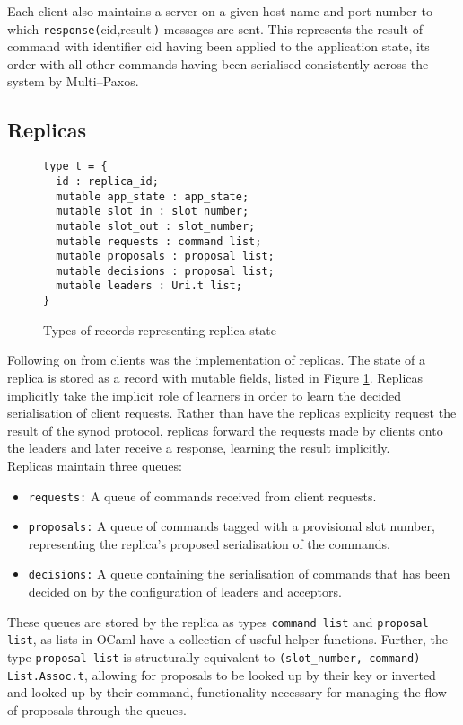 Each client also maintains a server on a given host name and port number to which \texttt{response($\textrm{cid}, \textrm{result}$)} messages are sent. This represents the result of command with identifier $\textrm{cid}$ having been applied to the application state, its order with all other commands having been serialised consistently across the system by Multi--Paxos.

\subsection{Replicas}
\label{section:replicas}

\begin{figure}
\begin{lstlisting}
type t = {
  id : replica_id;
  mutable app_state : app_state;
  mutable slot_in : slot_number;
  mutable slot_out : slot_number;
  mutable requests : command list;
  mutable proposals : proposal list;
  mutable decisions : proposal list;
  mutable leaders : Uri.t list;
}
\end{lstlisting}
\centering
\caption{Types of records representing replica state}
\label{fig:replica-types}
\end{figure}

Following on from clients was the implementation of replicas. The state of a replica is stored as a record with mutable fields, listed in Figure \ref{fig:replica-types}. Replicas implicitly take the implicit role of learners in order to learn the decided serialisation of client requests. Rather than have the replicas explicity request the result of the synod protocol, replicas forward the requests made by clients onto the leaders and later receive a response, learning the result implicitly. \\

Replicas maintain three queues:
\begin{itemize}
  \item \texttt{requests:} A queue of commands received from client requests.
  \item \texttt{proposals:} A queue of commands tagged with a provisional slot number, representing the replica's proposed serialisation of the commands.
  \item \texttt{decisions:} A queue containing the serialisation of commands that has been decided on by the configuration of leaders and acceptors.
\end{itemize}

These queues are stored by the replica as types \texttt{command list} and \texttt{proposal list}, as lists in OCaml have a collection of useful helper functions. Further, the type \texttt{proposal list} is structurally equivalent to \texttt{(slot\_number, command) List.Assoc.t}, allowing for proposals to be looked up by their key or inverted and looked up by their command, functionality necessary for managing the flow of proposals through the queues. \\


